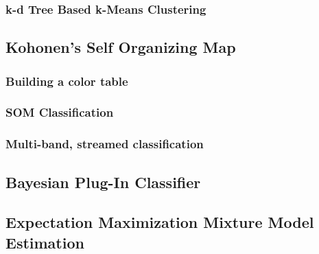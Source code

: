 \subsubsection{k-d Tree Based k-Means Clustering}
\label{sec:KdTreeBasedKMeansClustering}
\ifitkFullVersion

\fi
\subsection{Kohonen's Self Organizing Map}
\label{sec:SOM}

\subsubsection{Building a color table}
\label{sec:SOMColorTable}

\subsubsection{SOM Classification}
\label{sec:SOMClassification}


\subsubsection{Multi-band, streamed classification}

\ifitkFullVersion

\fi


\subsection{Bayesian Plug-In Classifier}
\label{sec:BayesianPluginClassifier}

\ifitkFullVersion

\fi

\subsection{Expectation Maximization Mixture Model Estimation}
\label{sec:ExpectationMaximizationMixtureModelEstimation}

